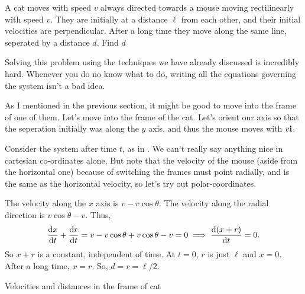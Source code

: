         \begin{example}
            A cat moves with speed $v$ always directed towards a mouse moving rectilinearly with speed $v$. They are initially at a distance $\ell$ from each other, 
            and their initial velocities are perpendicular. After a long time they move along the same line, seperated
            by a distance $d$. Find $d$ 
            
            \begin{soln}
                    Solving this problem using the techniques we have already discussed is incredibly hard. 
                    Whenever you do no know what to do, writing all the equations governing the system isn't a bad idea.
                    
                    As I mentioned in the previous section, it might be good to move into the frame of one 
                    of them. Let's move into the frame of the cat. Let's orient our axis so that the seperation initially 
                    was along the $y$ axis, and thus the mouse moves with $v\mathbf{\boldsymbol{i}}$. 

                    Consider the system after time $t$, as in . We can't really 
                    say anything nice in cartesian co-ordinates alone. But note that the velocity of the mouse (aside from the 
                    horizontal one) because of switching the frames must point radially, and is the 
                    same as the horizontal velocity, so let's try out 
                    polar-coordinates. 
                    
                    The velocity along the $x$ axis 
                    is $v - v\cos\theta$. The velocity along the radial direction is $v\cos\theta - v$. Thus,
                    \[
                        \dv{x}{t} + \dv{r}{t} = v - v\cos\theta + v\cos\theta - v = 0 \implies \dv{(x + r)}{t} = 0.
                    \]
                    So $x + r$ is a constant, independent of time. At $t = 0$, $r$ is just $\ell$ and $x = 0$. After a long 
                    time, $x = r$. So, $d = r = \ell/2$. 
            \end{soln}
        \end{example}

    \begin{marginfigure}
        \vspace{-18em}
        \caption{Velocities and distances in the frame of cat}
        \label{fig: fox-chase}
    \end{marginfigure}
        
